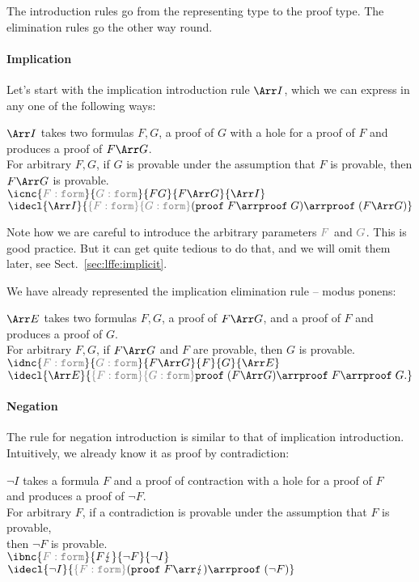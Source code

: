 The introduction rules go from the representing type to the proof type. The elimination rules go the other way round.

\newcommand{\implicit}[1]{{\color{gray}#1}}

\paragraph{Implication}
Let's start with the implication introduction rule $\impl I$, which we can express in any one of the following ways:
\begin{center}
$\impl I$ takes \implicit{two formulas $F,G$}, a proof of $G$ with a hole for a proof of $F$ and produces a proof of $F\impl G$.\\[.5cm]
\implicit{For arbitrary $F,G$}, if $G$ is provable under the assumption that $F$ is provable, then $F\impl G$ is provable.\\[.5cm]
$\icnc{\implicit{F:\FORM}}{\implicit{G:\FORM}}{F\der G}{\der F\impl G}{\impl I}$\\[.5cm]
$\idecl{\impl I}{\implicit{\{F:\FORM\}\{G:\FORM\}}(\PROOF\; F\arr \PROOF\;G)\arr\PROOF\;(F\impl G)}$
\end{center}
Note how we are careful to introduce the arbitrary parameters $\implicit{F}$ and $\implicit{G}$. This is good practice. But it can get quite tedious to do that, and we will omit them later, see Sect.~\ref{sec:lffe:implicit}.

\noindent
We have already represented the implication elimination rule -- modus ponens:
\begin{center}
$\impl E$ takes \implicit{two formulas $F,G$}, a proof of $F\impl G$, and a proof of $F$ and produces a proof of $G$.\\[.5cm]
\implicit{For arbitrary $F,G$}, if $F\impl G$ and $F$ are provable, then $G$ is provable.\\[.5cm]
$\idnc{\implicit{F:\FORM}}{\implicit{G:\FORM}}{\der F\impl G}{\der F}{\der G}{\impl E}$\\[.5cm]
$\idecl{\impl E}{\implicit{\{F:\FORM\}\{G:\FORM\}}\PROOF\; (F\impl G)\arr \PROOF\;F\arr\PROOF\;G.}$
\end{center}

\paragraph{Negation}
The rule for negation introduction is similar to that of implication introduction. Intuitively, we already know it as proof by contradiction:
\begin{center}
$\neg I$ takes \implicit{a formula $F$} and a proof of contraction with a hole for a proof of $F$\\ and produces a proof of $\neg F$. \\[0.5cm]
\implicit{For arbitrary $F$}, if a contradiction is provable under the assumption that $F$ is provable,\\ then $\neg F$ is provable. \\[0.5cm]
$\ibnc{\implicit{F:\FORM}}{F\der \contra}{\der \neg F}{\neg I}$ \\[0.5cm]
$\idecl{\neg I}{\implicit{\{F:\FORM\}}(\PROOF\; F\arr \contra)\arr\PROOF\;(\neg F)}$
\end{center}

